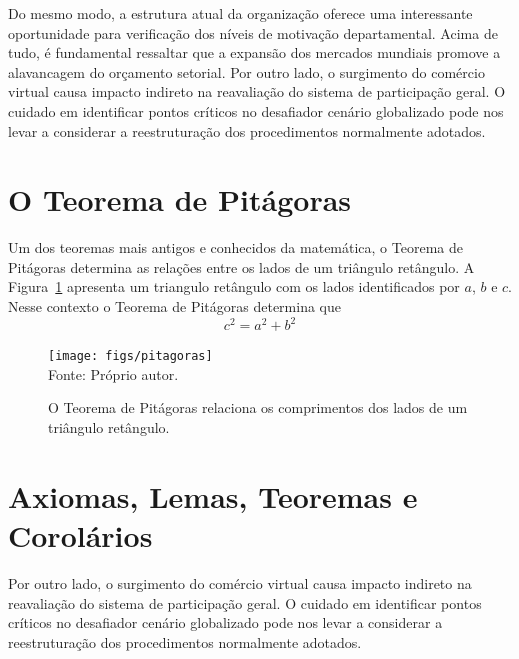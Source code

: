 \documentclass[fleqn]{icat-ufal}
\begin{document}
Do mesmo modo, a estrutura atual da organização oferece uma interessante
oportunidade para verificação dos níveis de motivação departamental. Acima de
tudo, é fundamental ressaltar que a expansão dos mercados mundiais promove a
alavancagem do orçamento setorial. Por outro lado, o surgimento do comércio
virtual causa impacto indireto na reavaliação do sistema de participação geral.
O cuidado em identificar pontos críticos no desafiador cenário globalizado pode
nos levar a considerar a reestruturação dos procedimentos normalmente adotados. 

\section{O Teorema de Pitágoras}
\label{sec:o_teorema_de_pitagoras}

Um dos teoremas mais antigos e conhecidos da matemática, o Teorema de Pitágoras
determina as relações entre os lados de um triângulo retângulo. A
Figura~\ref{fig:pitagoras} apresenta um triangulo retângulo com os lados
identificados por $a$, $b$ e $c$. Nesse contexto o Teorema de Pitágoras 
determina que
\begin{equation}
    \label{equ:pitagoras}
    c^2 = a^2 + b^2
\end{equation}

\begin{figure}[hbt]
    \centering
    \caption[Teorema de Pitágoras]
            {O Teorema de Pitágoras relaciona os comprimentos dos lados de um triângulo retângulo.}
    \label{fig:pitagoras}
    \texttt{[image: figs/pitagoras]} 
    \\ Fonte: Próprio autor.
\end{figure}

\section{Axiomas, Lemas, Teoremas e Corolários}
\label{sec:axiomas_lemas_teoremas_e_corolarios}

Por outro lado, o surgimento do comércio virtual causa impacto indireto na 
reavaliação do sistema de participação geral. O cuidado em identificar pontos 
críticos no desafiador cenário globalizado pode nos levar a considerar a 
reestruturação dos procedimentos normalmente adotados. 
\end{document}
